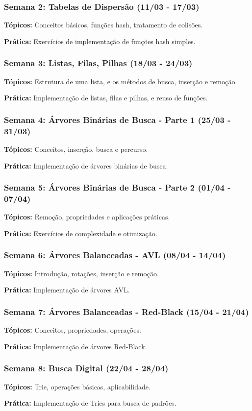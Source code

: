 \begin{frame}
  \frametitle{Semana 2: Tabelas de Dispersão (11/03 - 17/03)}
  \textbf{Tópicos:} Conceitos básicos, funções hash, tratamento de colisões.
  
  \textbf{Prática:} Exercícios de implementação de funções hash simples.
\end{frame}

\begin{frame}
  \frametitle{Semana 3: Listas, Filas, Pilhas (18/03 - 24/03)}
  \textbf{Tópicos:} Estrutura de uma lista, e os métodos de busca, inserção e remoção.
  
  \textbf{Prática:} Implementação de listas, filas e pilhas, e reuso de funções.
\end{frame}

\begin{frame}
  \frametitle{Semana 4: Árvores Binárias de Busca - Parte 1 (25/03 - 31/03)}
  \textbf{Tópicos:} Conceitos, inserção, busca e percurso.
  
  \textbf{Prática:} Implementação de árvores binárias de busca.
\end{frame}

\begin{frame}
  \frametitle{Semana 5: Árvores Binárias de Busca - Parte 2 (01/04 - 07/04)}
  \textbf{Tópicos:} Remoção, propriedades e aplicações práticas.
  
  \textbf{Prática:} Exercícios de complexidade e otimização.
\end{frame}

\begin{frame}
  \frametitle{Semana 6: Árvores Balanceadas - AVL (08/04 - 14/04)}
  \textbf{Tópicos:} Introdução, rotações, inserção e remoção.
  
  \textbf{Prática:} Implementação de árvores AVL.
\end{frame}

\begin{frame}
  \frametitle{Semana 7: Árvores Balanceadas - Red-Black (15/04 - 21/04)}
  \textbf{Tópicos:} Conceitos, propriedades, operações.
  
  \textbf{Prática:} Implementação de árvores Red-Black.
\end{frame}

\begin{frame}
  \frametitle{Semana 8: Busca Digital (22/04 - 28/04)}
  \textbf{Tópicos:} Trie, operações básicas, aplicabilidade.
  
  \textbf{Prática:} Implementação de Tries para busca de padrões.
\end{frame}

